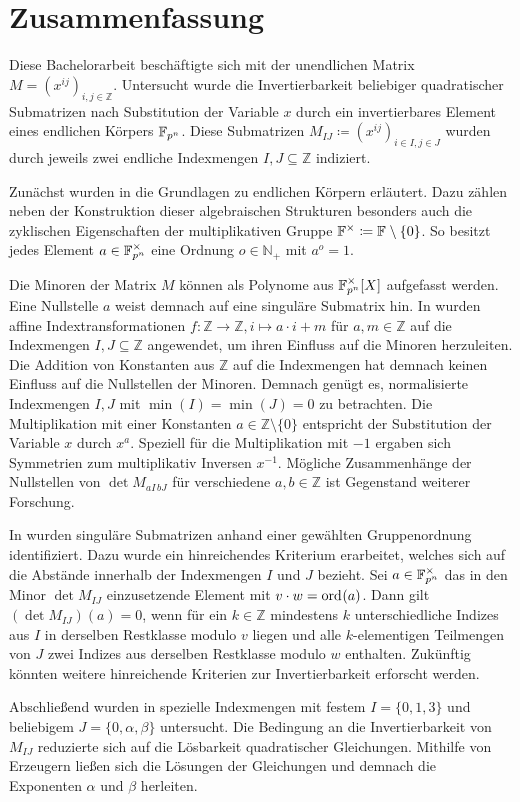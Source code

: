 \section{Zusammenfassung}

Diese Bachelorarbeit beschäftigte sich mit der unendlichen Matrix $M = \left( x^{ij} \right)_{i,j \in \mathbb{Z}}$. Untersucht wurde die Invertierbarkeit beliebiger quadratischer Submatrizen nach Substitution der Variable $x$ durch ein invertierbares Element eines endlichen Körpers $\field{p}[n]$. Diese Submatrizen $M_{IJ} \coloneqq \left( x^{ij} \right)_{i \in I,j \in J}$ wurden durch jeweils zwei endliche Indexmengen $I,J \subseteq \mathbb{Z}$ indiziert. 

Zunächst wurden in  die Grundlagen zu endlichen Körpern erläutert. Dazu zählen neben der Konstruktion dieser algebraischen Strukturen besonders auch die zyklischen Eigenschaften der multiplikativen Gruppe $\field{}^\times \coloneqq \field{} \setminus \{0\}$. So besitzt jedes Element $a \in \field{p}[n]^\times$ eine Ordnung $o \in \mathbb{N}_+$ mit $a^o = 1$.

Die Minoren der Matrix $M$ können als Polynome aus $\field{p}[n]^\times [X]$ aufgefasst werden. Eine Nullstelle $a$ weist demnach auf eine singuläre Submatrix hin. In  wurden affine Indextransformationen $f:\mathbb{Z} \rightarrow \mathbb{Z}, i \mapsto a\cdot i + m$ für $a,m \in \mathbb{Z}$ auf die Indexmengen $I,J \subseteq \mathbb{Z}$ angewendet, um ihren Einfluss auf die Minoren herzuleiten. Die Addition von Konstanten aus $\mathbb{Z}$ auf die Indexmengen hat demnach keinen Einfluss auf die Nullstellen der Minoren. Demnach genügt es, normalisierte Indexmengen $I,J$ mit $\min(I) = \min(J) = 0$ zu betrachten. Die Multiplikation mit einer Konstanten $a \in \mathbb{Z}\setminus\{0\}$ entspricht der Substitution der Variable $x$ durch $x^a$. Speziell für die Multiplikation mit $-1$ ergaben sich Symmetrien zum multiplikativ Inversen $x^{-1}$. Mögliche Zusammenhänge der Nullstellen von $\det M_{aI\,bJ}$ für verschiedene $a,b\in \mathbb{Z}$ ist Gegenstand weiterer Forschung.

In  wurden singuläre Submatrizen anhand einer gewählten Gruppenordnung identifiziert. Dazu wurde ein hinreichendes Kriterium erarbeitet, welches sich auf die Abstände innerhalb der Indexmengen $I$ und $J$ bezieht. Sei $a\in \field{p}[n]^\times$ das in den Minor $\det M_{IJ}$ einzusetzende Element mit $v\cdot w = \ord{a}$. Dann gilt $(\det M_{IJ})(a) = 0$, wenn für ein $k\in \mathbb{Z}$ mindestens $k$ unterschiedliche Indizes aus $I$ in derselben Restklasse modulo $v$ liegen und alle $k$-elementigen Teilmengen von $J$ zwei Indizes aus derselben Restklasse modulo $w$ enthalten. Zukünftig könnten weitere hinreichende Kriterien zur Invertierbarkeit erforscht werden.

Abschließend wurden in  spezielle Indexmengen mit festem $I = \{0,1,3\}$ und beliebigem $J = \{0,\alpha,\beta\}$ untersucht. Die Bedingung an die Invertierbarkeit von $M_{IJ}$ reduzierte sich auf die Lösbarkeit quadratischer Gleichungen. Mithilfe von Erzeugern ließen sich die Lösungen der Gleichungen und demnach die Exponenten $\alpha$ und $\beta$ herleiten.